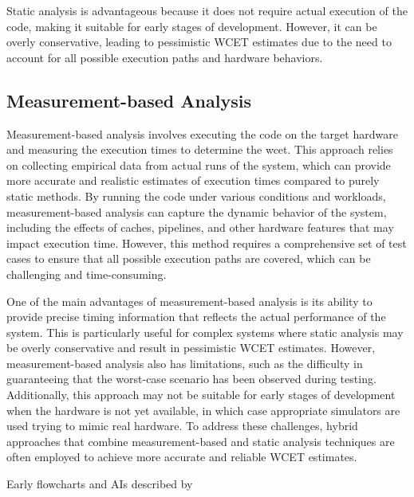 
Static analysis is advantageous because it does not require actual execution of the code, making it suitable for early stages of development. However, it can be overly conservative, leading to pessimistic WCET estimates due to the need to account for all possible execution paths and hardware behaviors.

\subsection{Measurement-based Analysis}\label{sec:measurement_analysis}
Measurement-based analysis involves executing the code on the target hardware and measuring the execution times to determine the \ac{wcet}. 
This approach relies on collecting empirical data from actual runs of the system, which can provide more accurate and realistic estimates of execution times compared to purely static methods. 
By running the code under various conditions and workloads, measurement-based analysis can capture the dynamic behavior of the system, including the effects of caches, pipelines, and other hardware features that may impact execution time.
However, this method requires a comprehensive set of test cases to ensure that all possible execution paths are covered, which can be challenging and time-consuming\cite{wilhelmWorstcaseExecutiontimeProblem2008}.

One of the main advantages of measurement-based analysis is its ability to provide precise timing information that reflects the actual performance of the system. 
This is particularly useful for complex systems where static analysis may be overly conservative and result in pessimistic WCET estimates.
However, measurement-based analysis also has limitations, such as the difficulty in guaranteeing that the worst-case scenario has been observed during testing. 
Additionally, this approach may not be suitable for early stages of development when the hardware is not yet available, in which case appropriate simulators are used trying to mimic real hardware.\cite{wilhelmWorstcaseExecutiontimeProblem2008}
To address these challenges, hybrid approaches that combine measurement-based and static analysis techniques are often employed to achieve more accurate and reliable WCET estimates\cite{kelterWCETAnalysisOptimization}.

Early flowcharts and \ac{AI}s described by \textcite{cousotAbstractInterpretationUnified1977}


